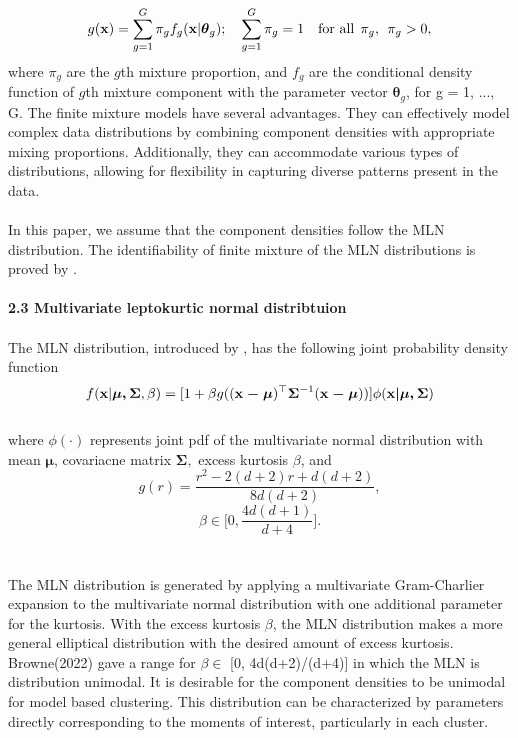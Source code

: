 \documentclass[11pt]{article}
\begin{document}
$$g(\bold{x}) = \sum_{g=1}^{G}\pi_gf_g(\bold{x}|\boldsymbol{\theta}_g); \quad \sum_{g=1}^{G}\pi_g = 1 \quad \text{for all} \:\: \pi_g, \:\: \pi_g > 0,$$
where $\pi_g$ are the $g$th mixture proportion, and $f_g$ are the conditional density function of $g$th mixture component with the parameter vector $\boldsymbol{\theta}_g$, for g = 1, ..., G. The finite mixture models have several advantages. They can effectively model complex data distributions by combining component densities with appropriate mixing proportions. Additionally, they can accommodate various types of distributions, allowing for flexibility in capturing diverse patterns present in the data.\\ \\
In this paper, we assume that the component densities follow the MLN distribution. The identifiability of finite mixture of the MLN distributions is proved by \citet{browne2022revitalizing}. 
\\ \\
\textbf{2.3 Multivariate leptokurtic normal distribtuion}\\
\\
The MLN distribution, introduced by \citet{bagnato2017multivariate}, has the following joint probability density function
\\
$$f(\bold{x}|\boldsymbol{\mu,\Sigma},\beta) = [1+\beta g((\boldsymbol{\bold{x}-\mu})^\top\boldsymbol{\Sigma}^{-1}(\boldsymbol{\bold{x}-\mu}))]\phi(\boldsymbol{\bold{x}|\mu,\Sigma})$$
\\
where $\phi(\cdot)$ represents joint pdf of the multivariate normal distribution with mean $\boldsymbol{\mu}$, covariacne matrix $\boldsymbol{\Sigma},$ excess kurtosis $\beta$, and 
$$g(r) = \frac{r^2-2(d+2)r+d(d+2)}{8d(d+2)},$$
$$\beta \in \Biggl[0,\frac{4d(d+1)}{d+4}\Biggr].$$
\\ \\ 
The MLN distribution is generated by applying a multivariate Gram-Charlier expansion to the multivariate normal distribution with one additional parameter for the kurtosis. With the excess kurtosis $\beta$, the MLN distribution makes a more general elliptical distribution with the desired amount of excess kurtosis. Browne(2022) gave a range for $\beta \in$ [0, 4d(d+2)/(d+4)] in which the MLN is distribution unimodal. It is desirable for the component densities to be unimodal for model based clustering. This distribution can be characterized by parameters directly corresponding to the moments of interest, particularly in each cluster.\\
\end{document}
